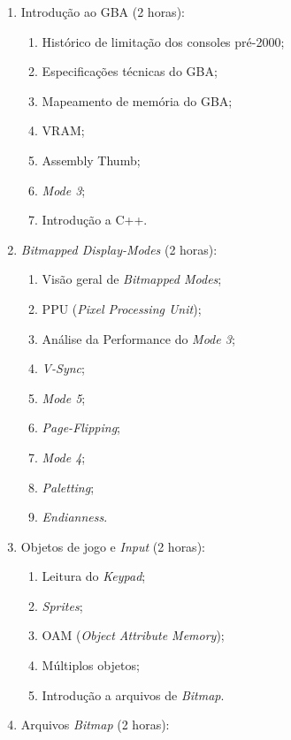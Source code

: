 \documentclass{article}
\begin{document}
\begin{enumerate}
    \item Introdução ao GBA (2 horas):
        \begin{enumerate}
            \item Histórico de limitação dos consoles pré-2000;
            \item Especificações técnicas do GBA\@;
            \item Mapeamento de memória do GBA\@;
            \item VRAM\@;
            \item Assembly Thumb;
            \item \textit{Mode 3};
            \item Introdução a C++.
        \end{enumerate}
    \item \textit{Bitmapped Display-Modes} (2 horas):
        \begin{enumerate}
            \item Visão geral de \textit{Bitmapped Modes};
            \item PPU (\textit{Pixel Processing Unit});
            \item Análise da Performance do \textit{Mode 3};
            \item \textit{V-Sync};
            \item \textit{Mode 5};
            \item \textit{Page-Flipping};
            \item \textit{Mode 4};
            \item \textit{Paletting};
            \item \textit{Endianness}.
        \end{enumerate}
    \item Objetos de jogo e \textit{Input} (2 horas):
        \begin{enumerate}
            \item Leitura do \textit{Keypad};
            \item \textit{Sprites};
            \item OAM (\textit{Object Attribute Memory});
            \item Múltiplos objetos;
            \item Introdução a arquivos de \textit{Bitmap}.
        \end{enumerate}
    \item Arquivos \textit{Bitmap} (2 horas):
        \begin{enumerate}

\end{enumerate}
\end{enumerate}
\end{document}
